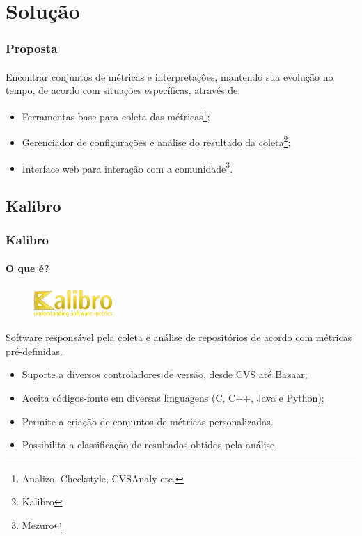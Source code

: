 \documentclass{beamer}
\begin{document}
\section{Solução}

\begin{frame}
  \frametitle{Proposta}
  \framesubtitle{}

  Encontrar conjuntos de métricas e interpretações, mantendo sua evolução no tempo, de acordo com situações específicas, através de:
  \begin{itemize}
    \item Ferramentas base para coleta das métricas\footnote{Analizo, Checkstyle, CVSAnaly etc.};
    \item Gerenciador de configurações e análise do resultado da coleta\footnote{Kalibro};
    \item Interface web para interação com a comunidade\footnote{Mezuro}.
  \end{itemize}


\end{frame}

  \subsection{Kalibro}

  \begin{frame}
    \frametitle{Kalibro}
    \framesubtitle{O que é?}

    \begin{figure}
      \begin{flushleft}
        \includegraphics[width=3cm, height=1.125cm]{images/logo-kalibro.png}
        \label{fig:logo-kalibro}
      \end{flushleft}
    \end{figure}

    Software responsável pela coleta e análise de repositórios de acordo com métricas pré-definidas.
    \begin{itemize}
      \item Suporte a diversos controladores de versão, desde CVS até Bazaar;
      \item Aceita códigos-fonte em diversas linguagens (C, C++, Java e Python);
      \item Permite a criação de conjuntos de métricas personalizadas.
      \item Possibilita a classificação de resultados obtidos pela análise.
    \end{itemize}
  \end{frame}
\end{document}
